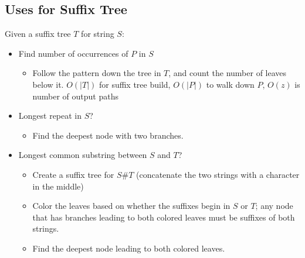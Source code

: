 \documentclass[10pt]{article}
\begin{document}
\subsection*{Uses for Suffix Tree}
Given a suffix tree $T$ for string $S$:
\begin{itemize}
	\item Find number of occurrences of $P$ in $S$
	\begin{itemize}
	    \item Follow the pattern down the tree in $T$, and count the number of leaves below it.  $O(|T|)$ for suffix tree build, $O(|P|)$ to walk down $P$, $O(z)$ is number of output paths
    \end{itemize}
    \item Longest repeat in $S$?  
    \begin{itemize}
	    \item Find the deepest node with two branches.
    \end{itemize}
    \item Longest common substring between $S$ and $T$?
    \begin{itemize}
	    \item Create a suffix tree for $S\#T$ (concatenate the two strings with a character in the middle)
	    \item Color the leaves based on whether the suffixes begin in $S$ or $T$; any node that has branches leading to both colored leaves must be suffixes of both strings.
	    \item Find the deepest node leading to both colored leaves.
    \end{itemize}
\end{itemize}
\end{document}
